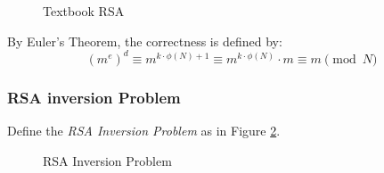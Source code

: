 \documentclass[11pt,a4paper]{article}
\begin{document}
\begin{figure}[H]
\begin{pchstack}[ center , boxed, space=0.5cm]
	
\begin{pcvstack}[space = 0.3cm]
		
\end{pcvstack}
\end{pchstack}
\caption{Textbook RSA}
\label{fig:textbook-rsa}
\end{figure}

By Euler's Theorem, the correctness is defined by:
$$
(m^e)^d \equiv m^{k \cdot \phi(N) + 1} \equiv m^{k \cdot \phi(N)} \cdot m \equiv m \pmod{N}
$$

\subsubsection{RSA inversion Problem}
Define the \textit{RSA Inversion Problem} as in Figure \ref{fig:rsa-inv}. 
\begin{figure}[H]
\begin{pchstack}[ center , boxed, space=0.5cm]
\end{pchstack}
\caption{RSA Inversion Problem}
\label{fig:rsa-inv}
\end{figure}
\end{document}
